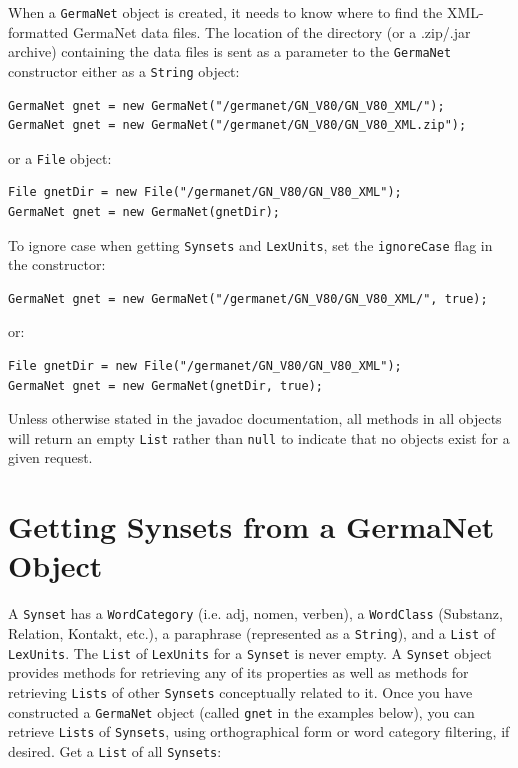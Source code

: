 \documentclass[12pt,a4paper,english,utf8]{report}
\begin{document}
When a \texttt{GermaNet} object is created, it needs to know where to find the XML-formatted GermaNet data files. The location of the directory (or a .zip/.jar archive) containing the data files is sent as a parameter to the \texttt{GermaNet} constructor either as a \texttt{String} object:

\begin{lstlisting}
GermaNet gnet = new GermaNet("/germanet/GN_V80/GN_V80_XML/");
GermaNet gnet = new GermaNet("/germanet/GN_V80/GN_V80_XML.zip");
\end{lstlisting}

or a \texttt{File} object:

\begin{lstlisting}
File gnetDir = new File("/germanet/GN_V80/GN_V80_XML");
GermaNet gnet = new GermaNet(gnetDir);
\end{lstlisting}

To ignore case when getting \texttt{Synsets} and \texttt{LexUnits}, set the \texttt{ignoreCase} flag in the constructor:

\begin{lstlisting}
GermaNet gnet = new GermaNet("/germanet/GN_V80/GN_V80_XML/", true);
\end{lstlisting}

or:

\begin{lstlisting}
File gnetDir = new File("/germanet/GN_V80/GN_V80_XML");
GermaNet gnet = new GermaNet(gnetDir, true);
\end{lstlisting}

Unless otherwise stated in the javadoc documentation, all methods in all objects will return an empty \texttt{List} rather than \texttt{null} to indicate that no objects exist for a given request.



\section{Getting Synsets from a GermaNet Object}

A \texttt{Synset} has a \texttt{WordCategory} (i.e. adj, nomen, verben), a \texttt{WordClass} (Substanz, Relation, Kontakt, etc.), a paraphrase (represented as a \texttt{String}), and a \texttt{List} of \texttt{LexUnits}. The \texttt{List} of \texttt{LexUnits} for a \texttt{Synset} is never empty.
A \texttt{Synset} object provides methods for retrieving any of its properties as well as methods for retrieving \texttt{Lists} of other \texttt{Synsets} conceptually related to it. Once you have constructed a \texttt{GermaNet} object (called \texttt{gnet} in the examples below), you can retrieve \texttt{Lists} of \texttt{Synsets}, using orthographical form or word category filtering, if desired.
Get a \texttt{List} of all \texttt{Synsets}:
\end{document}
